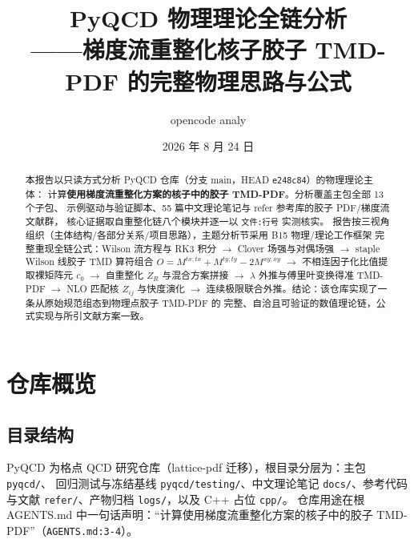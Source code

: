 \documentclass[UTF8]{ctexart}
\title{PyQCD 物理理论全链分析\\——梯度流重整化核子胶子 TMD-PDF 的完整物理思路与公式}
\author{opencode analy}
\date{2026 年 8 月 24 日}
\begin{document}
\maketitle

\begin{abstract}
本报告以只读方式分析 PyQCD 仓库（分支 main，HEAD \texttt{e248c84}）的物理理论主体：
计算\textbf{使用梯度流重整化方案的核子中的胶子 TMD-PDF}。分析覆盖主包全部 13 个子包、
示例驱动与验证脚本、55 篇中文理论笔记与 refer 参考库的胶子 PDF/梯度流文献群，
核心证据取自重整化链八个模块并逐一以 \texttt{文件:行号} 实测核实。
报告按三视角组织（主体结构/各部分关系/项目思路），主题分析节采用 B15 物理/理论工作框架
完整重现全链公式：Wilson 流方程与 RK3 积分 $\to$ Clover 场强与对偶场强 $\to$
staple Wilson 线胶子 TMD 算符组合 $O=M^{tx;tx}+M^{ty;ty}-2M^{xy;xy}$ $\to$
不相连因子化比值提取裸矩阵元 $c_0$ $\to$ 自重整化 $Z_R$ 与混合方案拼接 $\to$
$\lambda$ 外推与傅里叶变换得准 TMD-PDF $\to$ NLO 匹配核 $Z_{ij}$ 与快度演化 $\to$
连续极限联合外推。结论：该仓库实现了一条从原始规范组态到物理点胶子 TMD-PDF 的
完整、自洽且可验证的数值理论链，公式实现与所引文献方案一致。
\end{abstract}

\tableofcontents

\section{仓库概览}

\subsection{目录结构}
PyQCD 为格点 QCD 研究仓库（lattice-pdf 迁移），根目录分层为：主包 \texttt{pyqcd/}、
回归测试与冻结基线 \texttt{pyqcd/testing/}、中文理论笔记 \texttt{docs/}、参考代码与文献
\texttt{refer/}、产物归档 \texttt{logs/}，以及 C++ 占位 \texttt{cpp/}。
仓库用途在根 AGENTS.md 中一句话声明：``计算使用梯度流重整化方案的核子中的胶子
TMD-PDF''（\texttt{\nolinkurl{AGENTS.md:3-4}}）。
\end{document}

